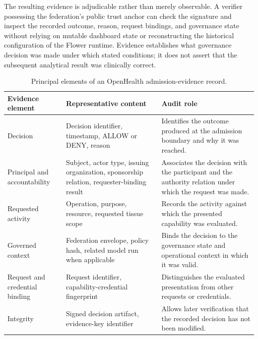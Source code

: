 \documentclass[twoside,11pt]{article}
\begin{document}
The resulting evidence is adjudicable rather than merely observable. A verifier possessing the federation's public trust anchor can check the signature and inspect the recorded outcome, reason, request bindings, and governance state without relying on mutable dashboard state or reconstructing the historical configuration of the Flower runtime. Evidence   establishes what governance decision was made under which stated conditions; it does not assert that the subsequent analytical result was clinically correct.

\begin{table}[htbp]
\centering
\caption{Principal elements of an OpenHealth admission-evidence record.}
\label{tab:evidence-record}
\small
\begin{tabularx}{\textwidth}{
    >{\raggedright\arraybackslash}p{3.4cm}
    >{\raggedright\arraybackslash}p{5.1cm}
    >{\raggedright\arraybackslash}X
}
\toprule
\textbf{Evidence element} &
\textbf{Representative content} &
\textbf{Audit role} \\
\midrule

Decision
&
Decision identifier, timestamp, ALLOW or DENY, reason
&
Identifies the outcome produced at the admission boundary and why it was reached.
\\

\addlinespace

Principal and accountability
&
Subject, actor type, issuing organization, sponsorship relation, requester-binding result
&
Associates the decision with the participant and the authority relation under which the request was made.
\\

\addlinespace

Requested activity
&
Operation, purpose, resource, requested tissue scope
&
Records the activity against which the presented capability was evaluated.
\\

\addlinespace

Governed context
&
Federation envelope, policy hash, related model run when applicable
&
Binds the decision to the governance state and operational context in which it was valid.
\\

\addlinespace

Request and credential binding
&
Request identifier, capability-credential fingerprint
&
Distinguishes the evaluated presentation from other requests or credentials.
\\

\addlinespace

Integrity
&
Signed decision artifact, evidence-key identifier
&
Allows later verification that the recorded decision has not been modified.
\\

\bottomrule
\end{tabularx}
\end{table}
\end{document}
